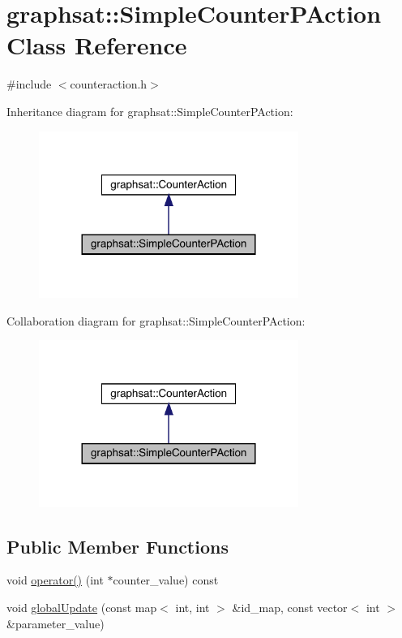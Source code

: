 \hypertarget{classgraphsat_1_1_simple_counter_p_action}{}\section{graphsat\+::Simple\+Counter\+P\+Action Class Reference}
\label{classgraphsat_1_1_simple_counter_p_action}


{\ttfamily \#include $<$counteraction.\+h$>$}



Inheritance diagram for graphsat\+::Simple\+Counter\+P\+Action\+:\nopagebreak
\begin{figure}[H]
\begin{center}
\leavevmode
\includegraphics[width=240pt]{classgraphsat_1_1_simple_counter_p_action__inherit__graph}
\end{center}
\end{figure}


Collaboration diagram for graphsat\+::Simple\+Counter\+P\+Action\+:\nopagebreak
\begin{figure}[H]
\begin{center}
\leavevmode
\includegraphics[width=240pt]{classgraphsat_1_1_simple_counter_p_action__coll__graph}
\end{center}
\end{figure}
\subsection*{Public Member Functions}
\begin{DoxyCompactItemize}
\item 
void \mbox{\hyperlink{classgraphsat_1_1_simple_counter_p_action_af73621e7e23c0da32f3cd957400fba84}{operator()}} (int $\ast$counter\+\_\+value) const
\item 
void \mbox{\hyperlink{classgraphsat_1_1_simple_counter_p_action_ae4d8689afbfd0d5f8a351bf19dbb8132}{global\+Update}} (const map$<$ int, int $>$ \&id\+\_\+map, const vector$<$ int $>$ \&parameter\+\_\+value)
\end{DoxyCompactItemize}
